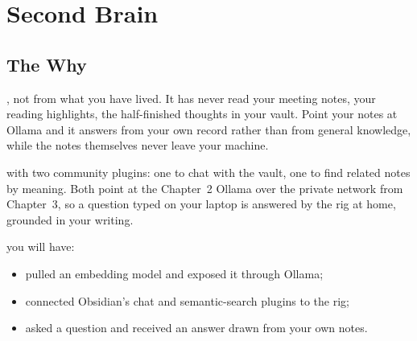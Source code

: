 
\chapter{Second Brain}
\vspace{1.5em}


\section{The Why}

, not from what you have lived. It has
never read your meeting notes, your reading highlights, the half-finished thoughts in
your vault. Point your notes at Ollama and it answers from your own record
rather than from general knowledge, while the notes themselves never leave your
machine.


 with two community plugins: one to chat with the
vault, one to find related notes by meaning. Both point at the Chapter~2 Ollama over
the private network from Chapter~3, so a question typed on your laptop is answered by
the rig at home, grounded in your writing.

 you will have:
\begin{itemize}
    \item pulled an embedding model and exposed it through Ollama;
    \item connected Obsidian's chat and semantic-search plugins to the rig;
    \item asked a question and received an answer drawn from your own notes.
\end{itemize}

